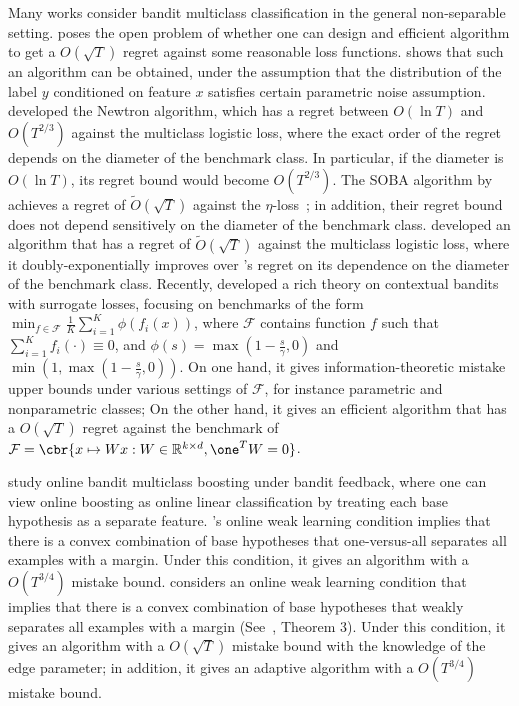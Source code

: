 \documentclass[12pt]{article}
\newcommand{\calF}{\mathcal{F}}  %
\newcommand{\R}{\mathbb{R}}  %
\begin{document}
Many works consider bandit multiclass classification in the general non-separable setting.
\cite{Abernethy-Rakhlin-2009} poses the open problem of whether one can design
and efficient algorithm to get a $O(\sqrt{T})$ regret against some reasonable loss functions.
\cite{CrammerG13} shows that such an algorithm can be obtained, under the assumption that the distribution of the label $y$ conditioned on feature $x$ satisfies certain parametric noise assumption.
\cite{Hazan-Kale-2011} developed the Newtron algorithm, which has a regret
between $O(\ln T)$ and $O(T^{2/3})$ against the multiclass logistic loss, where the exact order of the regret depends on the diameter of the benchmark class. In particular, if the diameter is $O(\ln T)$, its regret bound would become
$O(T^{2/3})$.
The SOBA algorithm by \cite{Beygelzimer-Orabona-Zhang-2017} achieves a regret of $\tilde{O}(\sqrt{T})$ against the $\eta$-loss~\cite{Orabona-Cesa-Bianchi-Gentile-2012}; in addition, their regret bound does not depend sensitively on the diameter of the benchmark class.
\cite{Foster-Kale-Luo-Mohri-Sridharan-2018} developed an algorithm that has a regret of $\tilde{O}(\sqrt{T})$ against the multiclass logistic loss, where it doubly-exponentially improves over \cite{Hazan-Kale-2011}'s regret on its dependence on the diameter of the benchmark class.
Recently, \cite{Foster-Krishnamurthy-2018} developed a rich theory on contextual bandits with surrogate losses, focusing on benchmarks of the form $\min_{f \in \calF} \frac 1 K \sum_{i=1}^K \phi( f_i(x) )$, where $\calF$ contains function $f$ such that $\sum_{i=1}^K f_i(\cdot) \equiv 0$,
and $\phi(s) = \max(1 - \frac s \gamma, 0)$ and $\min(1, \max(1 - \frac s \gamma, 0))$.
On one hand, it gives information-theoretic mistake upper bounds under various settings of $\calF$, for instance parametric and nonparametric classes; On the other hand, it gives an efficient algorithm that has a $O(\sqrt{T})$ regret against the benchmark of $\calF = \cbr{x \mapsto W x: W \in \R^{k \times d}, \one^T W = 0}$.

\cite{Chen-Lin-Lu-2014, Zhang-Jung-Tewari-2018} study online bandit multiclass boosting under bandit feedback, where one can view online boosting as online linear classification by treating each base hypothesis as a separate feature.
\cite{Chen-Lin-Lu-2014}'s online weak learning condition implies that there is a convex combination of base hypotheses that one-versus-all separates all examples with a margin. Under this condition, it gives an algorithm with a $O(T^{3/4})$ mistake bound.
\cite{Zhang-Jung-Tewari-2018} considers an online weak learning condition that implies that there is a convex combination of base hypotheses that weakly separates all examples with a margin (See~\cite{Mukherjee-Schapire-2013}, Theorem 3). Under this condition, it gives an algorithm with a $O(\sqrt{T})$ mistake bound with the knowledge of the edge parameter; in addition, it gives an adaptive algorithm with a $O(T^{3/4})$ mistake bound.
\end{document}
